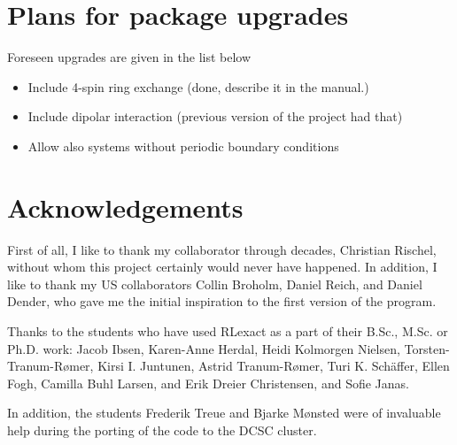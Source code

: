 \documentclass{article}
\begin{document}
\section{Plans for package upgrades}
Foreseen upgrades are given in the list below
\begin{itemize}
\item Include 4-spin ring exchange (done, describe it in the manual.)
\item Include dipolar interaction (previous version of the project had that)
\item Allow also systems without periodic boundary conditions
\end{itemize}

\section*{Acknowledgements}
First of all, I like to thank my collaborator through decades, Christian Rischel, without whom this project certainly would never have happened. In addition, I like to thank my US collaborators Collin Broholm, Daniel Reich, and Daniel Dender, who gave me the initial inspiration to the first version of the program.

Thanks to the students who have used RLexact as a part of their B.Sc., M.Sc. or Ph.D. work: 
Jacob Ibsen, Karen-Anne Herdal, Heidi Kolmorgen Nielsen, Torsten-Tranum-R\o mer, Kirsi I. Juntunen, 
Astrid Tranum-R\o mer, Turi K. Sch\"affer, Ellen Fogh, Camilla Buhl Larsen, and Erik Dreier Christensen, and Sofie Janas.

In addition, the students Frederik Treue and Bjarke M\o nsted were of invaluable help during the porting of the code to the DCSC cluster.
\end{document}
